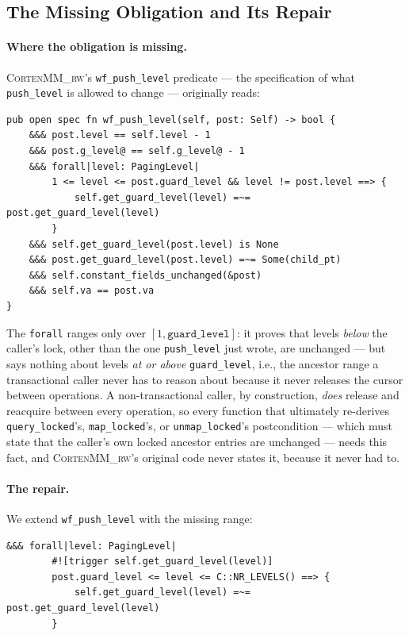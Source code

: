 \documentclass[10pt]{article}
\newcommand{\corten}[1]{\textsc{CortenMM\_#1}}
\newcommand{\vfn}[1]{\texttt{#1}}
\begin{document}
\subsection{The Missing Obligation and Its Repair}
\label{sec:method:repair}

\paragraph{Where the obligation is missing.} \corten{rw}'s
\vfn{wf\_push\_level} predicate --- the specification of what
\vfn{push\_level} is allowed to change --- originally reads:

\begin{lstlisting}[style=verus]
pub open spec fn wf_push_level(self, post: Self) -> bool {
    &&& post.level == self.level - 1
    &&& post.g_level@ == self.g_level@ - 1
    &&& forall|level: PagingLevel|
        1 <= level <= post.guard_level && level != post.level ==> {
            self.get_guard_level(level) =~= post.get_guard_level(level)
        }
    &&& self.get_guard_level(post.level) is None
    &&& post.get_guard_level(post.level) =~= Some(child_pt)
    &&& self.constant_fields_unchanged(&post)
    &&& self.va == post.va
}
\end{lstlisting}

The \vfn{forall} ranges only over $[1, \mathtt{guard\_level}]$: it
proves that levels \emph{below} the caller's lock, other than the one
\vfn{push\_level} just wrote, are unchanged --- but says nothing about
levels \emph{at or above} \vfn{guard\_level}, i.e., the ancestor range a
transactional caller never has to reason about because it never releases
the cursor between operations. A non-transactional caller, by
construction, \emph{does} release and reacquire between every operation,
so every function that ultimately re-derives \vfn{query\_locked}'s,
\vfn{map\_locked}'s, or \vfn{unmap\_locked}'s postcondition --- which
must state that the caller's own locked ancestor entries are unchanged
--- needs this fact, and \corten{rw}'s original code never states it,
because it never had to.

\paragraph{The repair.} We extend \vfn{wf\_push\_level} with the missing
range:

\begin{lstlisting}[style=verus]
    &&& forall|level: PagingLevel|
        #![trigger self.get_guard_level(level)]
        post.guard_level <= level <= C::NR_LEVELS() ==> {
            self.get_guard_level(level) =~= post.get_guard_level(level)
        }
\end{lstlisting}
\end{document}
